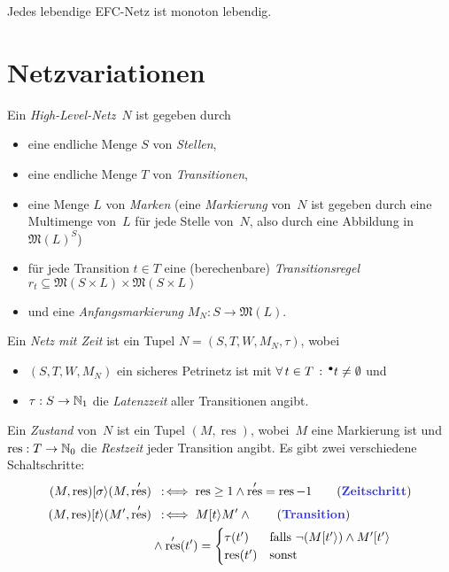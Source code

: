\documentclass{cheat-sheet}
\newcommand{\preset}[1]{{}^\bullet{#1}} %
\newcommand{\activeTransition}[1]{[{#1}\rangle} %
\newcommand{\Multisets}{\mathfrak{M}} %
\DeclareMathOperator{\resTime}{res} %
\begin{document}
\begin{kor}
  Jedes lebendige EFC-Netz ist monoton lebendig.
\end{kor}

\section{Netzvariationen}


\begin{defn}
  Ein \emph{High-Level-Netz}~$N$ ist gegeben durch
  \begin{itemize}
    \item eine endliche Menge $S$ von \textit{Stellen},
    \item eine endliche Menge $T$ von \textit{Transitionen},
    \item eine Menge $L$ von \textit{Marken} (eine \textit{Markierung} von~$N$ ist gegeben durch eine Multimenge von~$L$ für jede Stelle von~$N$, also durch eine Abbildung in $\Multisets(L)^S$)
    \item für jede Transition $t \in T$ eine (berechenbare) \textit{Transitionsregel} $r_t \subseteq \Multisets(S \times L) \times \Multisets(S \times L)$
    \item und eine \textit{Anfangsmarkierung} $M_N : S \to \Multisets(L)$.
  \end{itemize}
\end{defn}


\begin{defn}
  Ein \emph{Netz mit Zeit} ist ein Tupel $N = (S, T, W, M_N, \tau)$, wobei
  \begin{itemize}
    \item $(S, T, W, M_N)$ ein sicheres Petrinetz ist mit $\fa{t \in T} \preset{t} \neq \emptyset$ und
    \item $\tau : S \to \mathbb{N}_1$ die \emph{Latenzzeit} aller Transitionen angibt.
  \end{itemize}
  Ein \emph{Zustand} von~$N$ ist ein Tupel $(M, \resTime)$, wobei~$M$ eine Markierung ist und $\resTime : T \to \N_0$ die \textit{Restzeit} jeder Transition angibt.
  Es gibt zwei verschiedene Schaltschritte:
  \begin{align*}
    (M, \resTime) \activeTransition{\sigma} (M, \resTime') & \coloniff
    \resTime \geq 1 \wedge \resTime' = \resTime - 1 \tag{\emph{Zeitschritt}} \\
    (M, \resTime) \activeTransition{t} (M', \resTime') & \coloniff
    M \activeTransition{t} M' \wedge \tag{\emph{Transition}} \\
    & \wedge \resTime'(t') = \begin{cases}
      \tau(t') & \text{falls $\neg (M \activeTransition{t'}) \wedge M' \activeTransition{t'}$} \\
      \resTime(t') & \text{sonst}
    \end{cases}
  \end{align*}
\end{defn}
\end{document}
